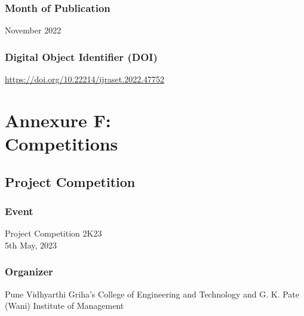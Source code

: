 \documentclass[oneside, 12pt]{book}
\begin{document}
			\subsubsection{Month of Publication}
				November 2022
			\subsubsection{Digital Object Identifier (DOI)}
				\href{https://doi.org/10.22214/ijraset.2022.47752}{https://doi.org/10.22214/ijraset.2022.47752}
			
	\newpage
	\section{Annexure F:\\Competitions}
	\newpage
		\subsection{Project Competition}
			\subsubsection{Event}
				Project Competition 2K23\\5th May, 2023
			\subsubsection{Organizer}
				Pune Vidhyarthi Griha’s College of Engineering and Technology and G. K. Pate (Wani) Institute of Management
			
	\newpage
\end{document}
